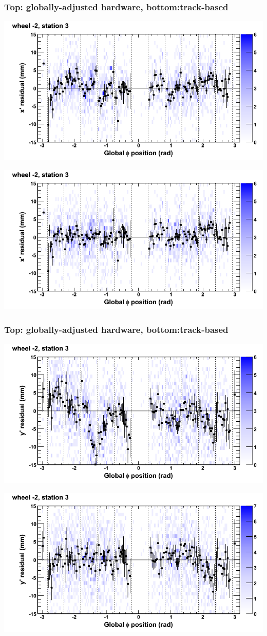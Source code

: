 \documentclass[compress]{beamer}
\begin{document}
\begin{frame}
\frametitle{Top: globally-adjusted hardware, bottom:track-based}
\includegraphics[width=0.7\linewidth]{NOV4_mapplots_HW/DTvsphi_st3whA_x.png}

\includegraphics[width=0.7\linewidth]{NOV4_mapplots/DTvsphi_st3whA_x.png}
\end{frame}

\begin{frame}
\frametitle{Top: globally-adjusted hardware, bottom:track-based}
\includegraphics[width=0.7\linewidth]{NOV4_mapplots_HW/DTvsphi_st3whA_y.png}

\includegraphics[width=0.7\linewidth]{NOV4_mapplots/DTvsphi_st3whA_y.png}
\end{frame}
\end{document}
